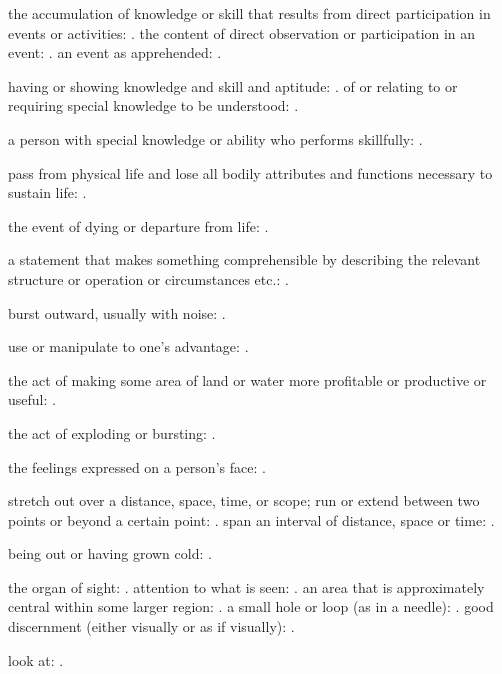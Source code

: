   the accumulation of knowledge or skill that results from direct participation in events or activities: . the content of direct observation or participation in an event: . an event as apprehended: .

  having or showing knowledge and skill and aptitude: . of or relating to or requiring special knowledge to be understood: .

  a person with special knowledge or ability who performs skillfully: .

  pass from physical life and lose all bodily attributes and functions necessary to sustain life: .

  the event of dying or departure from life: .

  a statement that makes something comprehensible by describing the relevant structure or operation or circumstances etc.: .

  burst outward, usually with noise: .

  use or manipulate to one's advantage: .

  the act of making some area of land or water more profitable or productive or useful: .

  the act of exploding or bursting: .

  the feelings expressed on a person's face: .

  stretch out over a distance, space, time, or scope; run or extend between two points or beyond a certain point: . span an interval of distance, space or time: .

  being out or having grown cold: .

  the organ of sight: . attention to what is seen: . an area that is approximately central within some larger region: . a small hole or loop (as in a needle): . good discernment (either visually or as if visually): .

  look at: .


